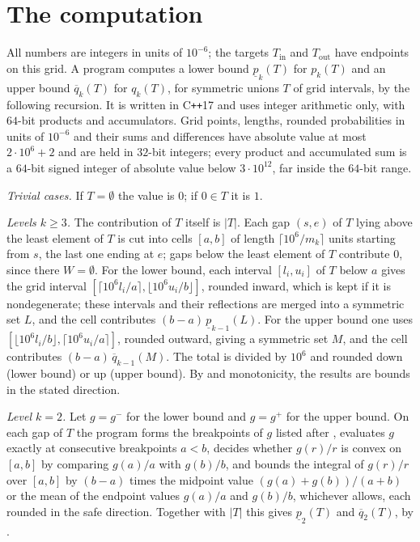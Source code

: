 \documentclass[11pt,colorlinks]{charlie}
\newcommand{\Tin}{T_{\mathrm{in}}}
\newcommand{\Tout}{T_{\mathrm{out}}}
\begin{document}
\section{The computation}\label{sec:computation}
All numbers are integers in units of $10^{-6}$; the targets $\Tin$ and $\Tout$ have endpoints on this grid. A program computes a lower bound $\underline p_k(T)$ for $p_k(T)$ and an upper bound $\overline q_k(T)$ for $q_k(T)$, for symmetric unions $T$ of grid intervals, by the following recursion. It is written in C\texttt{++}17 and uses integer arithmetic only, with $64$-bit products and accumulators. Grid points, lengths, rounded probabilities in units of $10^{-6}$ and their sums and differences have absolute value at most $2\cdot10^6+2$ and are held in $32$-bit integers; every product and accumulated sum is a $64$-bit signed integer of absolute value below $3\cdot10^{12}$, far inside the $64$-bit range.

\emph{Trivial cases.} If $T=\emptyset$ the value is $0$; if $0\in T$ it is $1$.

\emph{Levels $k\ge3$.} The contribution of $T$ itself is $|T|$. Each gap $(s,e)$ of $T$ lying above the least element of $T$ is cut into cells $[a,b]$ of length $\lceil10^6/m_k\rceil$ units starting from $s$, the last one ending at $e$; gaps below the least element of $T$ contribute $0$, since there $W=\emptyset$. For the lower bound, each interval $[l_i,u_i]$ of $T$ below $a$ gives the grid interval $[\lceil10^6l_i/a\rceil,\lfloor10^6u_i/b\rfloor]$, rounded inward, which is kept if it is nondegenerate; these intervals and their reflections are merged into a symmetric set $L$, and the cell contributes $(b-a)\,\underline p_{k-1}(L)$. For the upper bound one uses $[\lfloor10^6l_i/b\rfloor,\lceil10^6u_i/a\rceil]$, rounded outward, giving a symmetric set $M$, and the cell contributes $(b-a)\,\overline q_{k-1}(M)$. The total is divided by $10^6$ and rounded down (lower bound) or up (upper bound). By  and monotonicity, the results are bounds in the stated direction.

\emph{Level $k=2$.} Let $g=g^-$ for the lower bound and $g=g^+$ for the upper bound. On each gap of $T$ the program forms the breakpoints of $g$ listed after , evaluates $g$ exactly at consecutive breakpoints $a<b$, decides whether $g(r)/r$ is convex on $[a,b]$ by comparing $g(a)/a$ with $g(b)/b$, and bounds the integral of $g(r)/r$ over $[a,b]$ by $(b-a)$ times the midpoint value $(g(a)+g(b))/(a+b)$ or the mean of the endpoint values $g(a)/a$ and $g(b)/b$, whichever  allows, each rounded in the safe direction. Together with $|T|$ this gives $\underline p_2(T)$ and $\overline q_2(T)$, by .
\end{document}
